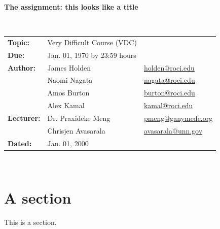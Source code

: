 \documentclass[11pt,a4paper]{article}
\begin{document}
    \thispagestyle{empty}
    \begin{center}
        {\bf \Large The assignment: this looks like a title}\\
        \vspace{-0.2cm}
    \end{center}
    \begin{flushleft}
        \makebox[\linewidth]{\rule{\textwidth}{0.8pt}}
        \vspace{-0.2cm}\\
        \begin{tabular}{p{1.6cm} p{7cm} p{3cm}}
            {\bf Topic:} & Very Difficult Course (VDC) & \\
            {\bf Due:} & Jan. 01, 1970 by 23:59 hours & \\
            {\bf Author:} & James Holden &
            \href{mailto:holden@roci.edu}{holden@roci.edu}\\
            {\bf ~} & Naomi Nagata &
            \href{mailto:nagata@roci.edu}{nagata@roci.edu}\\
            {\bf ~} & Amos Burton &
            \href{mailto:burton@roci.edu}{burton@roci.edu}\\
            {\bf ~} & Alex Kamal &
            \href{mailto:kamal@roci.edu}{kamal@roci.edu}\\
            {\bf Lecturer:} & Dr. Praxideke Meng &
            \href{mailto:pmeng@ganymede.org}{pmeng@ganymede.org}\\
            {\bf ~} & Chrisjen Avasarala &
            \href{mailto:avasarala@unn.gov}{avasarala@unn.gov}\\
            {\bf Dated:} & Jan. 01, 2000 &
        \end{tabular}
        \vspace{0.2cm}\\
        \makebox[\linewidth]{\rule{\textwidth}{0.8pt}}
    \end{flushleft} 

    \tableofcontents
    \clearpage
    \setcounter{page}{1} 
\section{A section}
\label{sec:a_section}
    This is a section.
    
\end{document}
